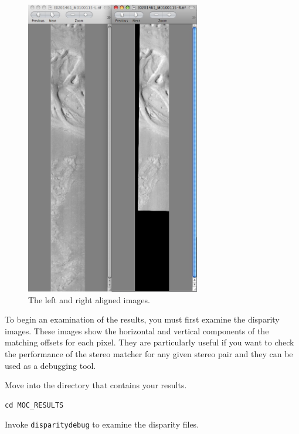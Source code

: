 \begin{figure}
\begin{center}
\includegraphics[width=3in]{images/p19-aligned.png}
\caption[P19 aligned image]{
    \label{p19-aligned}
	The left and right aligned images.
    }
\end{center}
\end{figure}

To begin an examination of the results, you must first examine the
disparity images. These images show the horizontal and vertical
components of the matching offsets for each pixel. They are
particularly useful if you want to check the performance of the
stereo matcher for any given stereo pair and they can be used as a
debugging tool.

Move into the directory that contains your results. 

\begin{verbatim}
cd MOC_RESULTS
\end{verbatim}

Invoke \texttt{disparitydebug} to examine the disparity files.

